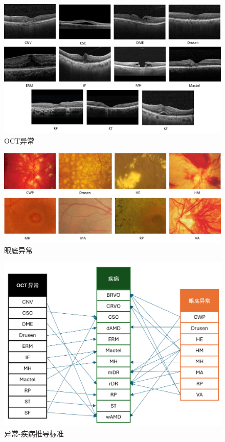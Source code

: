 \documentclass{article}
\begin{document}
	\begin{figure}[htbp]
		\centering
		\includegraphics[width=\linewidth]{Figs/OCT_Abnormities.png}
		\caption{OCT异常 \autocite{Duker_Waheed_Goldman_2022}}
		\vspace{0.3cm}
		\label{fig:OCT_abnormities}
	\end{figure}
	
	\begin{figure}[htbp]
		\centering
		\includegraphics[width=\linewidth]{Figs/fundus_Abnormities.png}
		\caption{眼底异常 \autocite{Wolf_Kirchhof_Reim_2006}}
		\vspace{0.3cm}
		\label{fig:fundus_abnormities}
	\end{figure}
	
	\begin{figure}[htbp]
		\centering
		\includegraphics[width=0.7\linewidth]{Figs/criteria.png}
		\caption{异常-疾病推导标准}
		\vspace{0.3cm}
		\label{fig:criteria}
	\end{figure}
\end{document}
